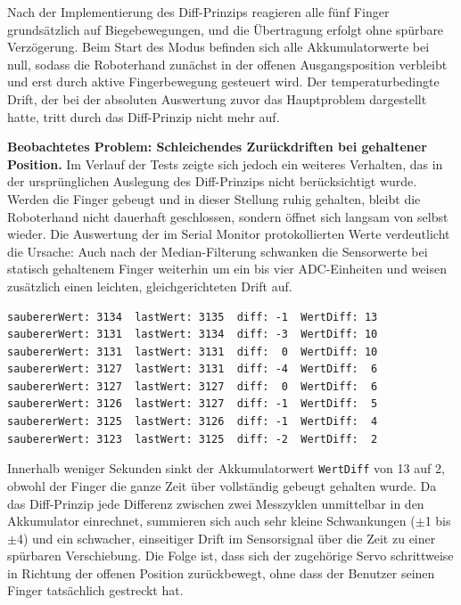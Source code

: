 \documentclass[12pt,a4paper]{article}
\begin{document}
Nach der Implementierung des Diff-Prinzips reagieren alle fünf Finger 
grundsätzlich auf Biegebewegungen, und die Übertragung erfolgt ohne 
spürbare Verzögerung. Beim Start des Modus befinden sich alle 
Akkumulatorwerte bei null, sodass die Roboterhand zunächst in der 
offenen Ausgangsposition verbleibt und erst durch aktive Fingerbewegung 
gesteuert wird. Der temperaturbedingte Drift, der bei der absoluten 
Auswertung zuvor das Hauptproblem dargestellt hatte, tritt durch das 
Diff-Prinzip nicht mehr auf.

\textbf{Beobachtetes Problem: Schleichendes Zurückdriften bei gehaltener 
Position.} Im Verlauf der Tests zeigte sich jedoch ein weiteres 
Verhalten, das in der ursprünglichen Auslegung des Diff-Prinzips nicht 
berücksichtigt wurde. Werden die Finger gebeugt und in dieser Stellung 
ruhig gehalten, bleibt die Roboterhand nicht dauerhaft geschlossen, 
sondern öffnet sich langsam von selbst wieder. Die Auswertung der im 
Serial Monitor protokollierten Werte verdeutlicht die Ursache: Auch 
nach der Median-Filterung schwanken die Sensorwerte bei statisch 
gehaltenem Finger weiterhin um ein bis vier ADC-Einheiten und weisen 
zusätzlich einen leichten, gleichgerichteten Drift auf.

\begin{lstlisting}[caption={Auszug aus dem Serial Monitor: alle Finger gebeugt und gehalten}]
saubererWert: 3134  lastWert: 3135  diff: -1  WertDiff: 13
saubererWert: 3131  lastWert: 3134  diff: -3  WertDiff: 10
saubererWert: 3131  lastWert: 3131  diff:  0  WertDiff: 10
saubererWert: 3127  lastWert: 3131  diff: -4  WertDiff:  6
saubererWert: 3127  lastWert: 3127  diff:  0  WertDiff:  6
saubererWert: 3126  lastWert: 3127  diff: -1  WertDiff:  5
saubererWert: 3125  lastWert: 3126  diff: -1  WertDiff:  4
saubererWert: 3123  lastWert: 3125  diff: -2  WertDiff:  2
\end{lstlisting}

Innerhalb weniger Sekunden sinkt der Akkumulatorwert \texttt{WertDiff} 
von 13 auf 2, obwohl der Finger die ganze Zeit über vollständig gebeugt 
gehalten wurde. Da das Diff-Prinzip jede Differenz zwischen zwei 
Messzyklen unmittelbar in den Akkumulator einrechnet, summieren sich 
auch sehr kleine Schwankungen ($\pm$1 bis $\pm$4) und ein schwacher, 
einseitiger Drift im Sensorsignal über die Zeit zu einer spürbaren 
Verschiebung. Die Folge ist, dass sich der zugehörige Servo schrittweise 
in Richtung der offenen Position zurückbewegt, ohne dass der Benutzer 
seinen Finger tatsächlich gestreckt hat.
\end{document}
